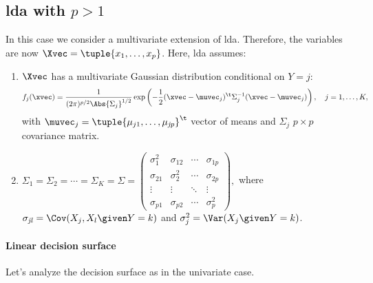 \subsection{\texorpdfstring{\acs{lda} with $p > 1$}{LDA with p > 1}}

In this case we consider a multivariate extension of \acs{lda}. Therefore, the variables are now ${\Xvec = \tuple{x_1, \ldots, x_p}}$. Here, \acs{lda} assumes:
\begin{enumerate}
    \item $\Xvec$ has a multivariate Gaussian distribution conditional on $Y = j$:
          \begin{equation}
              f_j(\xvec) = \frac{1}{(2\pi)^{p/2} \Abs{\Sigma_j}^{1/2}}\exp\left(-\frac{1}{2}(\xvec - \muvec_j)^\t \Sigma_j^{-1} (\xvec - \muvec_j)\right), \quad j = 1, \ldots, K,
          \end{equation}
          with $\muvec_j = \tuple{\mu_{j1}, \ldots, \mu_{\mathit{jp}}}^\t$ vector of means and $\Sigma_j$ $p\times p$ covariance matrix.
    \item $\Sigma_1 = \Sigma_2 = \cdots = \Sigma_K = \Sigma = \begin{pmatrix}
                  \sigma^2_{1} & \sigma_{12}  & \cdots & \sigma_{1p}  \\
                  \sigma_{21}  & \sigma^2_{2} & \cdots & \sigma_{2p}  \\
                  \vdots       & \vdots       & \ddots & \vdots       \\
                \sigma_{p1}  & \sigma_{p2}  & \cdots & \sigma^2_{p}
              \end{pmatrix},$ where $\sigma_{\mathit{jl}} = \Cov(X_j, X_l\given Y = k)$ and $\sigma^2_j = \Var(X_j\given Y = k)$.
\end{enumerate}

\paragraph{Linear decision surface}

Let's analyze the decision surface as in the univariate case.

